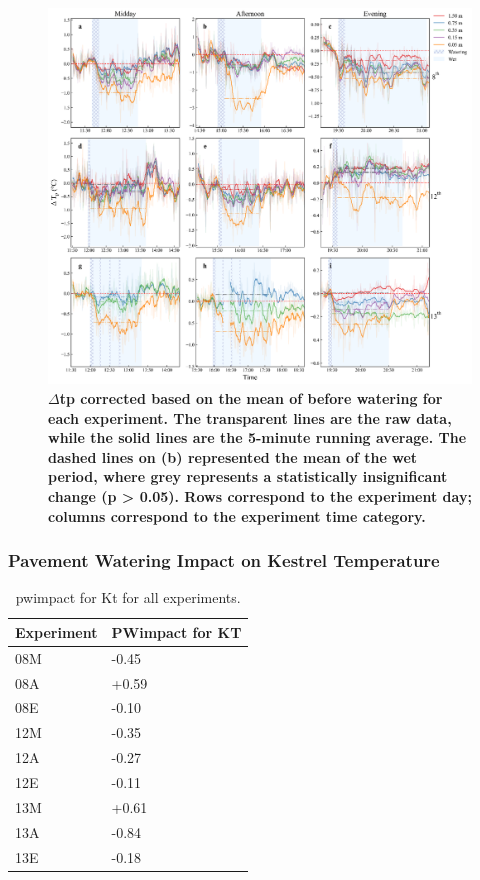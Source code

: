 \documentclass[final,3p,times,authoryear]{elsarticle}
\begin{document}
{\begin{figure}
\centering
\includegraphics[trim={0 0 0 0},clip,scale=1.0]{pict043.png}
\caption{\bf $\Delta$\gls{tp} corrected based on the mean of before watering for each experiment. The transparent
lines are the raw data, while the solid lines are the 5-minute running average. The dashed lines on (b)
represented the mean of the wet period, where grey represents a statistically insignificant change (p >
0.05). Rows correspond to the experiment day; columns correspond to the experiment time category.}
 \label{fig:7.14}
\end{figure}


\subsubsection{Pavement Watering Impact on Kestrel Temperature}\label{sec:appendix7.5.7}

\begin{table}[!ht]\caption{\gls{pwimpact} for \gls{Kt} for all experiments.}
    \centering
    \begin{tabular}{|l|l|}
    \hline
        Experiment & PWimpact for KT \\ \hline
        08M & -0.45 \\ \hline
        08A & +0.59 \\ \hline
        08E & -0.10 \\ \hline
        12M & -0.35 \\ \hline
        12A & -0.27 \\ \hline
        12E & -0.11 \\ \hline
        13M & +0.61 \\ \hline
        13A & -0.84 \\ \hline
        13E & -0.18 \\ \hline
    \end{tabular}\label{table:7.4}
\end{table}


}
\end{document}
